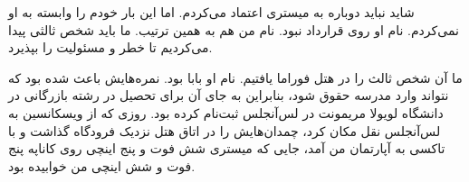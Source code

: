 شاید نباید دوباره به میستری اعتماد می‌کردم. اما این بار خودم را وابسته به او نمی‌کردم. نام او روی قرارداد نبود. نام من هم به همین ترتیب. ما باید شخص ثالثی پیدا می‌کردیم تا خطر و مسئولیت را بپذیرد.

ما آن شخص ثالث را در هتل فوراما یافتیم. نام او بابا بود. نمره‌هایش باعث شده بود که نتواند وارد مدرسه حقوق شود، بنابراین به جای آن برای تحصیل در رشته بازرگانی در دانشگاه لویولا مریمونت در لس‌آنجلس ثبت‌نام کرده بود. روزی که از ویسکانسین به لس‌آنجلس نقل مکان کرد، چمدان‌هایش را در اتاق هتل نزدیک فرودگاه گذاشت و با تاکسی به آپارتمان من آمد، جایی که میستری شش فوت و پنج اینچی روی کاناپه پنج فوت و شش اینچی من خوابیده بود.